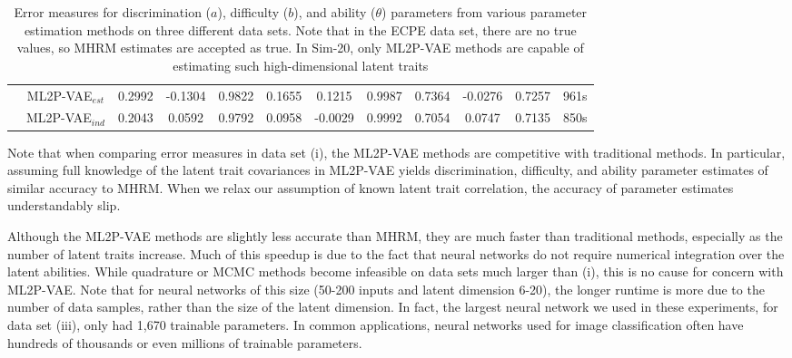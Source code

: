 \begin{table}
{\begin{tabular}{c|c|ccc|ccc|ccc|c}
& ML2P-VAE$_{est}$ & 0.2992  & -0.1304  & 0.9822  & 0.1655 &  0.1215  & 0.9987  & 0.7364   & -0.0276  & 0.7257 & 961s \\
& ML2P-VAE$_{ind}$ & 0.2043 &   0.0592  & 0.9792  & 0.0958   & -0.0029  & 0.9992  & 0.7054 &  0.0747  & 0.7135 & 850s \\
\hline
\end{tabular}
\caption{Error measures for discrimination ($a$), difficulty ($b$), and ability ($\theta$) parameters from various parameter estimation methods on three different data sets. Note that in the ECPE data set, there are no true values, so MHRM estimates are accepted as true. In Sim-20, only ML2P-VAE methods are capable of estimating such high-dimensional latent traits}
  \label{tab:results}
}
\end{table}

Note that when comparing error measures in data set (i), the ML2P-VAE methods are competitive with traditional methods. In particular, assuming full knowledge of the latent trait covariances in ML2P-VAE yields discrimination, difficulty, and ability parameter estimates of similar accuracy to MHRM. When we relax our assumption of known latent trait correlation, the accuracy of parameter estimates understandably slip.

Although the ML2P-VAE methods are slightly less accurate than MHRM, they are much faster than traditional methods, especially as the number of latent traits increase. Much of this speedup is due to the fact that neural networks do not require numerical integration over the latent abilities. While quadrature or MCMC methods become infeasible on data sets much larger than (i), this is no cause for concern with ML2P-VAE. Note that for neural networks of this size (50-200 inputs and latent dimension 6-20), the longer runtime is more due to the number of data samples, rather than the size of the latent dimension. In fact, the largest neural network we used in these experiments, for data set (iii), only had 1,670 trainable parameters. In common applications, neural networks used for image classification often have hundreds of thousands or even millions of trainable parameters.

